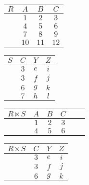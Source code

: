 \documentclass[12pt,a4paper,notitlepage,leqno]{article}
\begin{document}
\begin{center}
    \begin{tabular}{c|ccc}
        $R$ & $A$ & $B$ & $C$ \\\hline
         & $1$ & $2$ & $3$ \\
         & $4$ & $5$ & $6$ \\
         & $7$ & $8$ & $9$ \\
         & $10$ & $11$ & $12$
    \end{tabular}
    \hspace{1cm}
    \begin{tabular}{c|ccc}
        $S$ & $C$ & $Y$ & $Z$ \\\hline
         & $3$ & $e$ & $i$ \\
         & $3$ & $f$ & $j$ \\
         & $6$ & $g$ & $k$ \\
         & $7$ & $h$ & $l$
    \end{tabular}

    \vspace*{0.5cm}
    
    \begin{tabular}{c|ccccc}
        $R \ltimes S$  & $A$ & $B$ & $C$ \\\hline
         & $1$ & $2$ & $3$ \\
         & $4$ & $5$ & $6$
    \end{tabular}
    \hspace{1cm}
    \begin{tabular}{c|ccc}
        $R \rtimes S$ & $C$ & $Y$ & $Z$ \\\hline
         & $3$ & $e$ & $i$ \\
         & $3$ & $f$ & $j$ \\
         & $6$ & $g$ & $k$
    \end{tabular}
\end{center}
\end{document}
